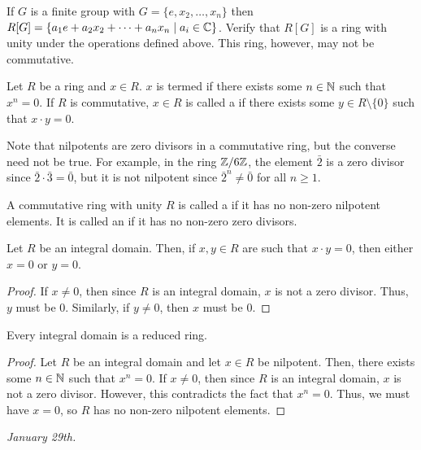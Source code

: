 If $G$ is a finite group with $G = \{e,x_{2},\ldots,x_{n}\}$ then $R[G] = \{a_{1}e + a_{2}x_{2} + \cdots + a_{n}x_{n} \mid a_{i} \in \mathbb{C}\}$. Verify that $R[G]$ is a ring with unity under the operations defined above. This ring, however, may not be commutative.

\begin{definition}
    Let $R$ be a ring and $x \in R$. $x$ is termed  if there exists some $n \in \mathbb{N}$ such that $x^{n} = 0$. If $R$ is commutative, $x \in R$ is called a  if there exists some $y \in R \setminus \{0\}$ such that $x \cdot y = 0$.
\end{definition}

Note that nilpotents are zero divisors in a commutative ring, but the converse need not be true. For example, in the ring $\mathbb{Z}/6\mathbb{Z}$, the element $\bar{2}$ is a zero divisor since $\bar{2} \cdot \bar{3} = \bar{0}$, but it is not nilpotent since $\bar{2}^{n} \neq \bar{0}$ for all $n \geq 1$.

\begin{definition}
    A commutative ring with unity $R$ is called a  if it has no non-zero nilpotent elements. It is called an  if it has no non-zero zero divisors.
\end{definition}

\begin{proposition}
    Let $R$ be an integral domain. Then, if $x,y \in R$ are such that $x \cdot y = 0$, then either $x = 0$ or $y = 0$.
\end{proposition}
\begin{proof}
    If $x \neq 0$, then since $R$ is an integral domain, $x$ is not a zero divisor. Thus, $y$ must be $0$. Similarly, if $y \neq 0$, then $x$ must be $0$.
\end{proof}

\begin{proposition}
    Every integral domain is a reduced ring.
\end{proposition}
\begin{proof}
    Let $R$ be an integral domain and let $x \in R$ be nilpotent. Then, there exists some $n \in \mathbb{N}$ such that $x^{n} = 0$. If $x \neq 0$, then since $R$ is an integral domain, $x$ is not a zero divisor. However, this contradicts the fact that $x^{n} = 0$. Thus, we must have $x = 0$, so $R$ has no non-zero nilpotent elements.
\end{proof}

\noindent \textit{January 29th.}

